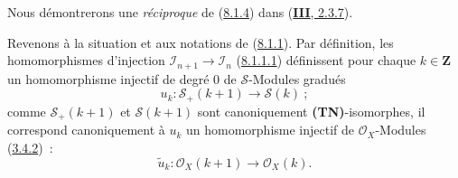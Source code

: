 Nous démontrerons une \emph{réciproque} de
(\hyperref[II.8.1.4-fr]{8.1.4}) dans
(\hyperref[III.2.3.7-fr]{\textbf{III}, 2.3.7}).

\begin{env}[8.1.5]
\label{II.8.1.5-fr}
Revenons à la situation et aux notations de
(\hyperref[II.8.1.1-fr]{8.1.1}). Par définition, les homomorphismes
d'injection $\mathcal{I}_{n+1}\to\mathcal{I}_n$
(\hyperref[II.8.1.1.1-fr]{8.1.1.1}) définissent pour chaque $k\in\mathbf{Z}$ un
homomorphisme injectif de degré $0$ de $\mathcal{S}$-Modules gradués
\begin{equation}
\label{II.8.1.5.1-fr}
  u_k:\mathcal{S}_+(k+1)\to\mathcal{S}(k)~;
\tag{8.1.5.1}
\end{equation}
comme $\mathcal{S}_+(k+1)$ et $\mathcal{S}(k+1)$ sont canoniquement
\textbf{(TN)}-isomorphes, il correspond canoniquement à $u_k$ un homomorphisme injectif
de $\mathcal{O}_X$-Modules (\hyperref[II.3.4.2-fr]{3.4.2})~:
\begin{equation}
\label{II.8.1.5.2-fr}
  \widetilde{u}_k:\mathcal{O}_X(k+1)\to\mathcal{O}_X(k).
\tag{8.1.5.2}
\end{equation}


\end{env}
